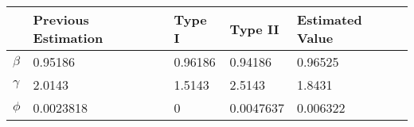 \begin{tabular}{lllll}
& Previous Estimation & Type I & Type II & Estimated Value \\ 
\hline 
$\beta$ & 0.95186 & 0.96186 & 0.94186 & 0.96525 \\ 
$\gamma$ & 2.0143 & 1.5143 & 2.5143 & 1.8431 \\ 
$\phi$ & 0.0023818 & 0 & 0.0047637 & 0.006322 \\ 
\hline 
\end{tabular}